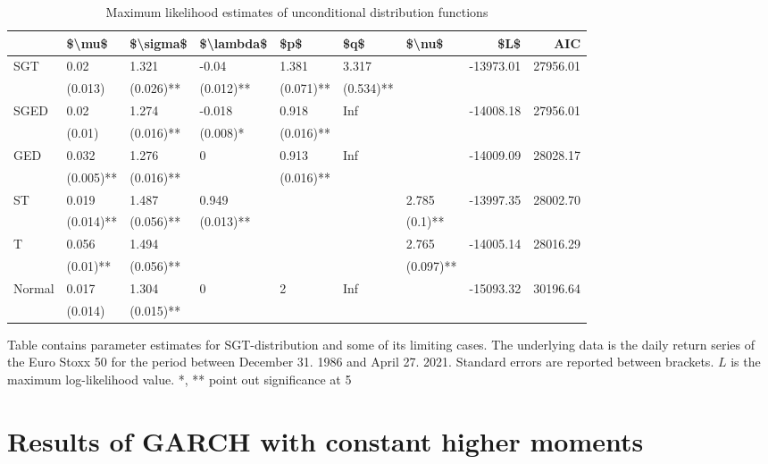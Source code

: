 \documentclass[a4paper, twoside]{templates/ociamthesis}
\begin{document}
\begin{table}[h!]

\caption{\label{tab:MLEtable}Maximum likelihood estimates of unconditional distribution functions}
\centering
\begin{threeparttable}
\begin{tabular}[t]{lllllllrr}
\toprule
 & \$\textbackslash{}mu\$ & \$\textbackslash{}sigma\$ & \$\textbackslash{}lambda\$ & \$p\$ & \$q\$ & \$\textbackslash{}nu\$ & \$L\$ & AIC\\
\midrule
SGT & 0.02 & 1.321 & -0.04 & 1.381 & 3.317 &  & -13973.01 & 27956.01\\
 & (0.013) & (0.026)** & (0.012)** & (0.071)** & (0.534)** &  &  & \\
SGED & 0.02 & 1.274 & -0.018 & 0.918 & Inf &  & -14008.18 & 27956.01\\
 & (0.01) & (0.016)** & (0.008)* & (0.016)** &  &  &  & \\
GED & 0.032 & 1.276 & 0 & 0.913 & Inf &  & -14009.09 & 28028.17\\
\addlinespace
 & (0.005)** & (0.016)** &  & (0.016)** &  &  &  & \\
ST & 0.019 & 1.487 & 0.949 &  &  & 2.785 & -13997.35 & 28002.70\\
 & (0.014)** & (0.056)** & (0.013)** &  &  & (0.1)** &  & \\
T & 0.056 & 1.494 &  &  &  & 2.765 & -14005.14 & 28016.29\\
 & (0.01)** & (0.056)** &  &  &  & (0.097)** &  & \\
\addlinespace
Normal & 0.017 & 1.304 & 0 & 2 & Inf &  & -15093.32 & 30196.64\\
 & (0.014) & (0.015)** &  &  &  &  &  & \\
\bottomrule
\end{tabular}
\begin{tablenotes}
\item Table contains parameter estimates for SGT-distribution and some of its limiting cases. The underlying data is the daily return series of the Euro Stoxx 50 for the period between December 31. 1986 and April 27. 2021. Standard errors are reported between brackets. $L$ is the maximum log-likelihood value. *, ** point out significance at 5%
\end{tablenotes}
\end{threeparttable}
\end{table}

\hypertarget{results-of-garch-with-constant-higher-moments}{%
\section{Results of GARCH with constant higher moments}\label{results-of-garch-with-constant-higher-moments}}
\end{document}
